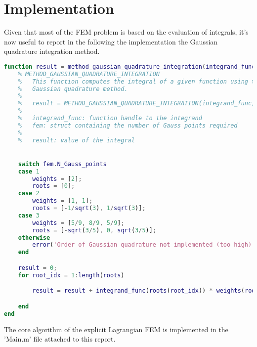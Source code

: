\section{Implementation}
\label{sec:implementation}

Given that most of the FEM problem is based on the evaluation of integrals, it's now useful to report in the following the implementation the Gaussian quadrature integration method.

\begin{lstlisting}[language=Matlab]
function result = method_gaussian_quadrature_integration(integrand_func, fem)
    % METHOD_GAUSSIAN_QUADRATURE_INTEGRATION
    %   This function computes the integral of a given function using the
    %   Gaussian quadrature method.
    %
    %   result = METHOD_GAUSSIAN_QUADRATURE_INTEGRATION(integrand_func, fem)
    %
    %   integrand_func: function handle to the integrand
    %   fem: struct containing the number of Gauss points required
    %
    %   result: value of the integral


    switch fem.N_Gauss_points
    case 1
        weights = [2];
        roots = [0];
    case 2
        weights = [1, 1];
        roots = [-1/sqrt(3), 1/sqrt(3)];
    case 3
        weights = [5/9, 8/9, 5/9];
        roots = [-sqrt(3/5), 0, sqrt(3/5)];
    otherwise
        error('Order of Gaussian quadrature not implemented (too high)')
    end

    result = 0;
    for root_idx = 1:length(roots)

        result = result + integrand_func(roots(root_idx)) * weights(root_idx);

    end
end
\end{lstlisting}

The core algorithm of the explicit Lagrangian FEM is implemented in the 'Main.m' file attached to this report.